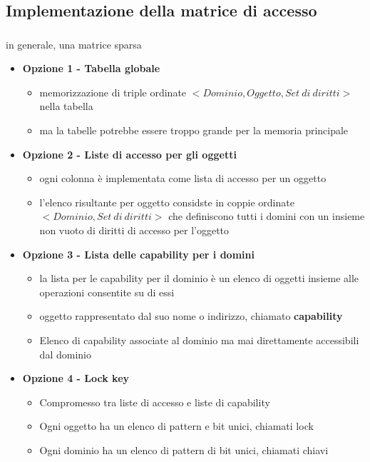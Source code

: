 \documentclass{beamer}
\newenvironment{mainframe}{
	\begin{frame}
		\frametitle{\insertsubsection}
		\framesubtitle{\insertsection}
	}{
	\end{frame}
}
\begin{document}
\subsection{Implementazione della matrice di accesso}
\begin{mainframe}
	in generale, una matrice sparsa
	\begin{itemize}
		\item \textbf{Opzione 1 - Tabella globale}
		\begin{itemize}
			\item memorizzazione di triple ordinate $< Dominio, Oggetto, Set \ di \ diritti >$ nella tabella
			\item ma la tabelle potrebbe essere troppo grande per la memoria principale
		\end{itemize}
		\item \textbf{Opzione 2 - Liste di accesso per gli oggetti}
		\begin{itemize}
			\item ogni colonna è implementata come lista di accesso per un oggetto
			\item l'elenco risultante per oggetto considste in coppie ordinate $<Dominio, Set \ di \ diritti>$ che definiscono tutti i domini con un insieme non vuoto di diritti di accesso per l'oggetto
		\end{itemize}
\end{itemize}
\end{mainframe}
\begin{frame}
	\begin{itemize}
			\item \textbf{Opzione 3 - Lista delle capability per i domini}
	\begin{itemize}
			\item la lista per le capability per il dominio è un elenco di oggetti insieme alle operazioni consentite su di essi
		\item oggetto rappresentato dal suo nome o indirizzo, chiamato \textbf{capability}
		\item Elenco di capability associate al dominio ma mai direttamente accessibili dal dominio
	\end{itemize}
\item \textbf{Opzione 4 - Lock key}
\begin{itemize}
	\item Compromesso tra liste di accesso e liste di capability
	\item Ogni oggetto ha un elenco di pattern e bit unici, chiamati lock
	\item Ogni dominio ha un elenco di pattern di bit unici, chiamati chiavi
\end{itemize}
	\end{itemize}
\end{frame}
\end{document}
